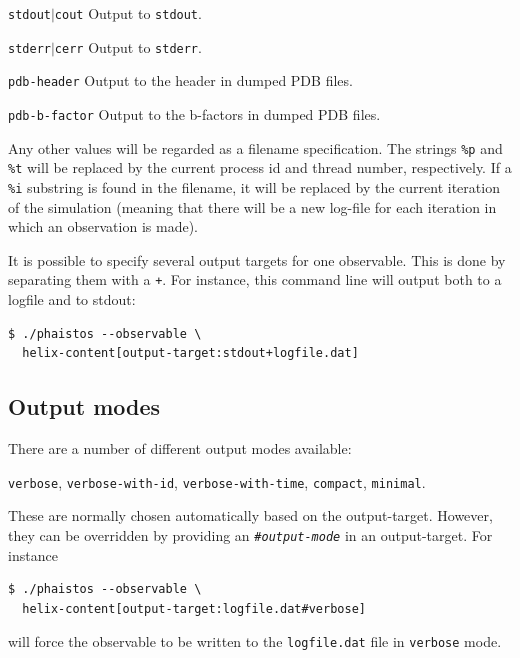 \documentclass[11pt,a4paper,twoside]{book}
\begin{document}
\begin{description}
\item{\texttt{stdout}$|$\texttt{cout}} Output to \texttt{stdout}.
\item{\texttt{stderr}$|$\texttt{cerr}} Output to \texttt{stderr}.
\item{\texttt{pdb-header}} Output to the header in dumped PDB files.
\item{\texttt{pdb-b-factor}} Output to the b-factors in dumped PDB files.
\end{description}

\noindent
Any other values will be regarded as a filename specification. The
strings \texttt{\%p} and \texttt{\%t} will be replaced by the current
process id and thread number, respectively. If a \texttt{\%i} substring
is found in the filename, it will be replaced by the current iteration
of the simulation (meaning that there will be a new log-file for each
iteration in which an observation is made).

It is possible to specify several output targets for one
observable. This is done by separating them with a \texttt{+}. For
instance, this command line will output both to a logfile and to
stdout:

\begin{verbatim}
$ ./phaistos --observable \
  helix-content[output-target:stdout+logfile.dat]
\end{verbatim}

\subsection{Output modes}
\label{sec:output-modes}

There are a number of different output modes available:

\begin{flushleft}
\texttt{verbose}, \texttt{verbose-with-id}, \texttt{verbose-with-time}, \texttt{compact}, \texttt{minimal}.
\end{flushleft}

\noindent These are normally chosen automatically based on the
output-target. However, they can be overridden by providing an
\texttt{\#\emph{output-mode}} in an output-target. For instance

\begin{verbatim}
$ ./phaistos --observable \
  helix-content[output-target:logfile.dat#verbose]
\end{verbatim}

\noindent
will force the observable to be written to the \texttt{logfile.dat}
file in \texttt{verbose} mode.
\end{document}
